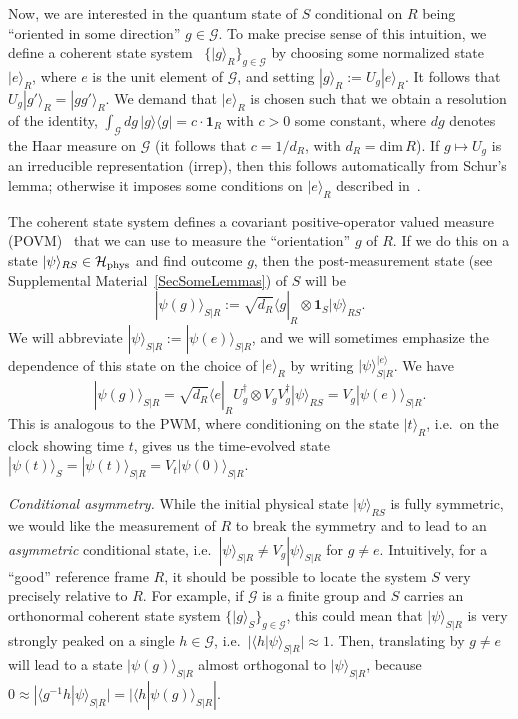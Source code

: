 \documentclass[aps,10pt,twocolumn,showpacs,pra,citeautoscript,amsmath,amssymb,floatfix,superscriptaddress]{revtex4-1}
\def\dim{{\mathrm{dim}}}
\newcommand{\cg}{\mathcal G}
\begin{document}
Now, we are interested in the quantum state of $S$ conditional on $R$ being ``oriented in some direction'' $g\in\mathcal{G}$. To make precise sense of this intuition, we define a coherent state system~\cite{Perelomov,DGHLM21} $\{|g\rangle_R\}_{g\in\mathcal{G}}$ by choosing some normalized state $|e\rangle_R$, where $e$ is the unit element of $\mathcal{G}$, and setting $|g\rangle_R:=U_g |e\rangle_R$. It follows that $U_g |g'\rangle_R = |gg'\rangle_R$. We demand that $|e\rangle_R$ is chosen such that we obtain a resolution of the identity, $\int_{\mathcal{G}}dg\,|g\rangle\langle g|=c\cdot\mathbf{1}_R$ with $c>0$ some constant, where $dg$ denotes the Haar measure on $\mathcal{G}$ (it follows that $c=1/d_R$, with $d_R=\dim\, R$). If $g\mapsto U_g$ is an irreducible representation (irrep), then this follows automatically from Schur's lemma; otherwise it imposes some conditions on $|e\rangle_R$ described in~\cite{DGHLM21}.

The coherent state system defines a covariant positive-operator valued measure (POVM)~\cite{Holevo,Busch,BRWS} that we can use to measure the ``orientation'' $g$ of $R$. If we do this on a state $|\psi\rangle_{RS}\in\mathcal{H}_{\rm phys}$ and find outcome $g$, then the post-measurement state (see Supplemental Material~\ref{SecSomeLemmas}) of $S$ will be
\begin{equation}
   |\psi(g)\rangle_{S|R}:=\sqrt{d_R}\langle g|_R\otimes\mathbf{1}_S |\psi\rangle_{RS}.
   \label{eqConditional}
\end{equation}
We will abbreviate $|\psi\rangle_{S|R}:=|\psi(e)\rangle_{S|R}$, and we will sometimes emphasize the dependence of this state on the choice of $|e\rangle_R$ by writing $|\psi\rangle_{S|R}^{|e\rangle}$. We have~\cite{DGHLM21}
\[
   |\psi(g)\rangle_{S|R}=\sqrt{d_R} \langle e|_R U_g^\dagger\otimes V_g V_g^\dagger |\psi\rangle_{RS}=V_g |\psi(e)\rangle_{S|R}.
\]
This is analogous to the PWM, where conditioning on the state $|t\rangle_R$, i.e.\ on the clock showing time $t$, gives us the time-evolved state $|\psi(t)\rangle_S=|\psi(t)\rangle_{S|R}=V_t |\psi(0)\rangle_{S|R}$.

\emph{Conditional asymmetry.} While the initial physical state $|\psi\rangle_{RS}$ is fully symmetric, we would like the measurement of $R$ to break the symmetry and to lead to an \emph{asymmetric} conditional state, i.e.\ $|\psi\rangle_{S|R} \neq V_g |\psi\rangle_{S|R}$ for $g\neq e$. Intuitively, for a ``good'' reference frame $R$, it should be possible to locate the system $S$ very precisely relative to $R$. For example, if $\mathcal{G}$ is a finite group and $S$ carries an orthonormal coherent state system $\{|g\rangle_S\}_{g\in\mathcal{G}}$, this could mean that $|\psi\rangle_{S|R}$ is very strongly peaked on a single $h\in\cg$, i.e.\ $|\langle h|\psi\rangle_{S|R}|\approx 1$. Then, translating by $g\neq e$ will lead to a state $|\psi(g)\rangle_{S|R}$ almost orthogonal to $|\psi\rangle_{S|R}$, because $0\approx |\langle g^{-1}h|\psi\rangle_{S|R}|=|\langle h|\psi(g)\rangle_{S|R}|$.
\end{document}
